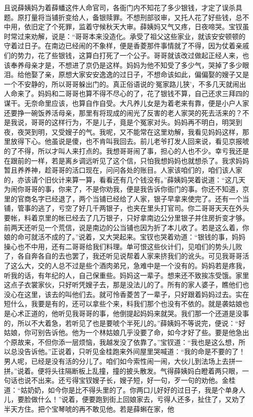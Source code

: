\begin{parag}
    且说薛姨妈为着薛蟠这件人命官司，各衙门内不知花了多少银钱，才定了误杀具题。原打量将当铺折变给人，备银赎罪。不想刑部驳审，又托人花了好些钱，总不中用，依旧定了个死罪，监着守候秋天大审。薛姨妈又气又疼，日夜啼哭。宝钗虽时常过来劝解，说是：“哥哥本来没造化。承受了祖父这些家业，就该安安顿顿的守着过日子。在南边已经闹的不象样，便是香菱那件事情就了不得，因为仗着亲戚们的势力，花了些银钱，这算白打死了一个公子。哥哥就该改过做起正经人来，也该奉养母亲才是，不想进了京仍是这样。妈妈为他不知受了多少气，哭掉了多少眼泪。给他娶了亲，原想大家安安逸逸的过日子，不想命该如此，偏偏娶的嫂子又是一个不安静的，所以哥哥躲出门的。真正俗语说的‘冤家路儿狭’，不多几天就闹出人命来了。妈妈和二哥哥也算不得不尽心的了，花了银钱不算，自己还求三拜四的谋干。无奈命里应该，也算自作自受。大凡养儿女是为着老来有靠，便是小户人家还要挣一碗饭养活母亲，那里有将现成的闹光了反害的老人家哭的死去活来的？不是我说，哥哥的这样行为，不是儿子，竟是个冤家对头。妈妈再不明白，明哭到夜，夜哭到明，又受嫂子的气。我呢，又不能常在这里劝解，我看见妈妈这样，那里放得下心。他虽说是傻，也不肯叫我回去。前儿老爷打发人回来说，看见京报唬的了不得，所以才叫人来打点的。我想哥哥闹了事，担心的人也不少。幸亏我还是在跟前的一样，若是离乡调远听见了这个信，只怕我想妈妈也就想杀了。我求妈妈暂且养养神，趁哥哥的活口现在，问问各处的账目。人家该咱们的，咱们该人家的，亦该请个旧伙计来算一算，看看还有几个钱没有。”薛姨妈哭着说道：“这几天为闹你哥哥的事，你来了，不是你劝我，便是我告诉你衙门的事。你还不知道，京里的官商名字已经退了，两个当铺已经给了人家，银子早拿来使完了。还有一个当铺，管事的逃了，亏空了好几千两银子，也夹在里头打官司。你二哥哥天天在外头要帐，料着京里的帐已经去了几万银子，只好拿南边公分里银子并住房折变才够。前两天还听见一个荒信，说是南边的公当铺也因为折了本儿收了。若是这么着，你娘的命可就活不成的了。”说着，又大哭起来。宝钗也哭着劝道：“银钱的事，妈妈操心也不中用，还有二哥哥给我们料理。单可恨这些伙计们，见咱们的势头儿败了，各自奔各自的去也罢了，我还听见说帮着人家来挤我们的讹头。可见我哥哥活了这么大，交的人总不过是些个酒肉弟兄，急难中是一个没有的。妈妈若是疼我，听我的话，有年纪的人，自己保重些。妈妈这一辈子。想来还不致挨冻受饿。家里这点子衣裳家伙，只好听凭嫂子去，那是没法儿的了。所有的家人婆子，瞧他们也没心在这里，该去的叫他们去。就可怜香菱苦了一辈子，只好跟着妈妈过去。实在短什么，我要是有的，还可以拿些个来，料我们那个也没有不依的。就是袭姑娘也是心术正道的，他听见我哥哥的事，他倒提起妈妈来就哭。我们那一个还道是没事的，所以不大着急，若听见了也是要唬个半死儿的。”薛姨妈不等说完，便说：“好姑娘，你可别告诉他。他为一个林姑娘几乎没要了命，如今才好了些。要是他急出个原故来，不但你添一层烦恼，我越发没了依靠了。”宝钗道：“我也是这么想，所以总没告诉他。”正说着，只听见金桂跑来外间屋里哭喊道：“我的命是不要的了！男人呢，已经是没有活的分儿了。咱们如今索性闹一闹，大伙儿到法场上去拼一拼。”说着。便将头往隔断板上乱撞，撞的披头散发。气得薛姨妈白瞪着两只眼，一句话也说不出来。还亏得宝钗嫂子长，嫂子短，好一句，歹一句的劝他。金桂道：“姑奶奶，如今你是比不得头里的了。你两口儿好好的过日子，我是个单身人儿，要脸做什么！”说着，便要跑到街上回娘家去，亏得人还多，扯住了，又劝了半天方住。把个宝琴唬的再不敢见他。若是薛蝌在家，他
\end{parag}
